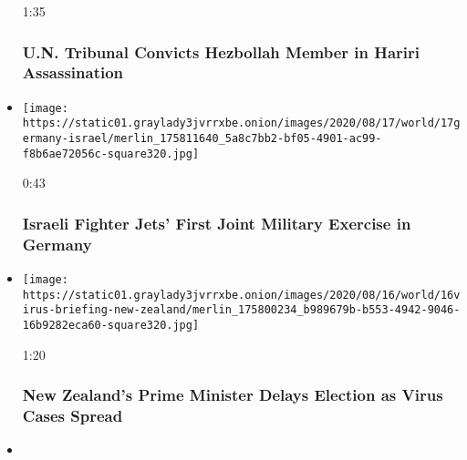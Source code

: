 \begin{itemize}
  1:35

  \hypertarget{un-tribunal-convicts-hezbollah-member-in-hariri-assassination}{%
  \subsubsection{U.N. Tribunal Convicts Hezbollah Member in Hariri
  Assassination}\label{un-tribunal-convicts-hezbollah-member-in-hariri-assassination}}
\item
  \href{https://www.nytimes3xbfgragh.onion/video/us/politics/100000007294367/israeli-fighter-jets-1st-joint-military-exercise-in-germany.html?action=click\&module=video-series-bar\&region=header\&pgtype=Article\&playlistId=video/world}{}

  \texttt{[image: https://static01.graylady3jvrrxbe.onion/images/2020/08/17/world/17germany-israel/merlin\_175811640\_5a8c7bb2-bf05-4901-ac99-f8b6ae72056c-square320.jpg]}

  0:43

  \hypertarget{israeli-fighter-jets-first-joint-military-exercise-in-germany}{%
  \subsubsection{Israeli Fighter Jets' First Joint Military Exercise in
  Germany}\label{israeli-fighter-jets-first-joint-military-exercise-in-germany}}
\item
  \href{https://www.nytimes3xbfgragh.onion/video/us/elections/100000007292203/new-zealand-delayed-election.html?action=click\&module=video-series-bar\&region=header\&pgtype=Article\&playlistId=video/world}{}

  \texttt{[image: https://static01.graylady3jvrrxbe.onion/images/2020/08/16/world/16virus-briefing-new-zealand/merlin\_175800234\_b989679b-b553-4942-9046-16b9282eca60-square320.jpg]}

  1:20

  \hypertarget{new-zealands-prime-minister-delays-election-as-virus-cases-spread}{%
  \subsubsection{New Zealand's Prime Minister Delays Election as Virus
  Cases
  Spread}\label{new-zealands-prime-minister-delays-election-as-virus-cases-spread}}
\item
  \href{https://www.nytimes3xbfgragh.onion/video/world/middleeast/100000007285123/beirut-blast-hospital-audio.html?action=click\&module=video-series-bar\&region=header\&pgtype=Article\&playlistId=video/world}{}


\end{itemize}
